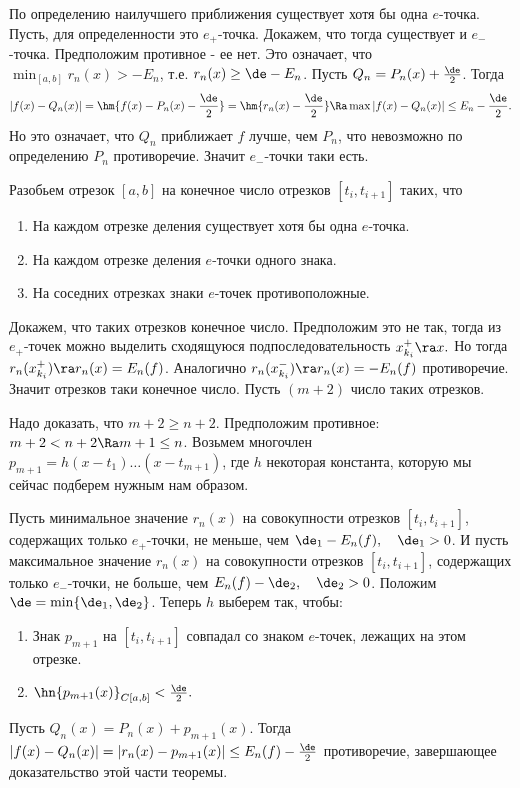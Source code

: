 \documentclass[a4paper]{article}
\begin{document}
По определению наилучшего приближения существует хотя бы одна
$e$-точка. Пусть, для определенности это $e_+$-точка. Докажем, что
тогда существует и $e_-$-точка. Предположим противное - ее нет.
Это означает, что $\min_{[a,b]}r_n(x)>-E_n$, т.е. $r_n(x)\ge
\de-E_n$. Пусть $Q_n=P_n(x)+\frac{\de}2$. Тогда
$$|f(x)-Q_n(x)|=\hm{f(x)-P_n(x)-\frac{\de}2}=\hm{r_n(x)-\frac{\de}2}\Ra
\max|f(x)-Q_n(x)|\le E_n-\frac{\de}2.$$ Но это означает, что
$Q_n$ приближает $f$ лучше, чем $P_n$, что невозможно по
определению $P_n$ противоречие. Значит $e_-$-точки таки есть.

Разобьем отрезок $[a,b]$ на конечное число отрезков
$[t_i,t_{i+1}]$ таких, что
\begin{enumerate}
\item
На каждом отрезке деления существует хотя бы одна $e$-точка.
\item
На каждом отрезке деления $e$-точки одного знака.
\item
На соседних отрезках знаки $e$-точек противоположные.
\end{enumerate}

Докажем, что таких отрезков конечное число. Предположим это не
так, тогда из $e_+$-точек можно выделить сходящуюся
подпоследовательность $x_{k_i}^+\ra x.$ Но тогда
$r_n(x_{k_i}^+)\ra r_n(x)=E_n(f)$. Аналогично
$r_n(x_{k_i}^-)\ra r_n(x)=-E_n(f)$ противоречие. Значит
отрезков таки конечное число. Пусть $(m+2)$ число таких
отрезков.

Надо доказать, что $m+2\ge n+2$. Предположим противное:
$m+2<n+2\Ra m+1\le n$. Возьмем многочлен
$p_{m+1}=h(x-t_1)\dots(x-t_{m+1})$, где $h$ некоторая константа,
которую мы сейчас подберем нужным нам образом.

Пусть минимальное значение $r_n(x)$ на совокупности отрезков
$[t_i,t_{i+1}]$, содержащих только $e_+$-точки, не меньше, чем
$\de_1-E_n(f),\quad\de_1>0$. И пусть максимальное значение
$r_n(x)$ на совокупности отрезков $[t_i,t_{i+1}]$, содержащих
только $e_-$-точки, не больше, чем
$E_n(f)-\de_2,\quad\de_2>0$. Положим
$\de=\min\{\de_1,\de_2\}$. Теперь $h$ выберем так, чтобы:
\begin{enumerate}
\item
Знак $p_{m+1}$ на $[t_i,t_{i+1}]$ совпадал со знаком $e$-точек,
лежащих на этом отрезке.
\item
$\hn{p_{m+1}(x)}_{C[a,b]}<\frac{\de}2.$
\end{enumerate}

Пусть $Q_n(x)=P_n(x)+p_{m+1}(x)$. Тогда
$|f(x)-Q_n(x)|=|r_n(x)-p_{m+1}(x)|\le E_n(f)-\frac{\de}2$ противоречие, завершающее доказательство этой части теоремы.
\end{document}

